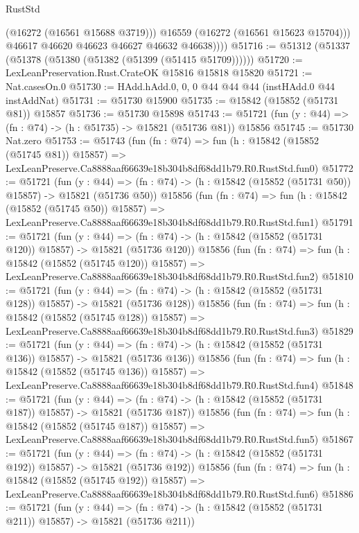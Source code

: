 \begin{lexlean}{RustStd}
\begin{coremodule}
                (@16272 (@16561 @15688 @3719)))
              @16559
              (@16272 (@16561 @15623 @15704)))
            @46617
            @46620
            @46623
            @46627
            @46632
            @46638))))
@51716 := @51312 (@51337 (@51378 (@51380 (@51382 (@51399 (@51415 @51709))))))
@51720 := LexLeanPreservation.Rust.CrateOK @15816 @15818 @15820
@51721 := Nat.casesOn.{0}
@51730 := HAdd.hAdd.{0, 0, 0} @44 @44 @44 (instHAdd.{0} @44 instAddNat)
@51731 := @51730 @15900
@51735 := @15842 (@15852 (@51731 @81)) @15857
@51736 := @51730 @15898
@51743 := @51721 (fun (y : @44) => (fn : @74) -> (h : @51735) -> @15821 (@51736 @81)) @15856
@51745 := @51730 Nat.zero
@51753 := @51743
    (fun (fn : @74) =>
    fun (h : @15842 (@15852 (@51745 @81)) @15857) =>
    LexLeanPreserve.Ca8888aaf66639e18b304b8df68dd1b79.R0.RustStd.fun0)
@51772 := @51721
    (fun (y : @44) =>
    (fn : @74) -> (h : @15842 (@15852 (@51731 @50)) @15857) -> @15821 (@51736 @50))
    @15856
    (fun (fn : @74) =>
    fun (h : @15842 (@15852 (@51745 @50)) @15857) =>
    LexLeanPreserve.Ca8888aaf66639e18b304b8df68dd1b79.R0.RustStd.fun1)
@51791 := @51721
    (fun (y : @44) =>
    (fn : @74) -> (h : @15842 (@15852 (@51731 @120)) @15857) -> @15821 (@51736 @120))
    @15856
    (fun (fn : @74) =>
    fun (h : @15842 (@15852 (@51745 @120)) @15857) =>
    LexLeanPreserve.Ca8888aaf66639e18b304b8df68dd1b79.R0.RustStd.fun2)
@51810 := @51721
    (fun (y : @44) =>
    (fn : @74) -> (h : @15842 (@15852 (@51731 @128)) @15857) -> @15821 (@51736 @128))
    @15856
    (fun (fn : @74) =>
    fun (h : @15842 (@15852 (@51745 @128)) @15857) =>
    LexLeanPreserve.Ca8888aaf66639e18b304b8df68dd1b79.R0.RustStd.fun3)
@51829 := @51721
    (fun (y : @44) =>
    (fn : @74) -> (h : @15842 (@15852 (@51731 @136)) @15857) -> @15821 (@51736 @136))
    @15856
    (fun (fn : @74) =>
    fun (h : @15842 (@15852 (@51745 @136)) @15857) =>
    LexLeanPreserve.Ca8888aaf66639e18b304b8df68dd1b79.R0.RustStd.fun4)
@51848 := @51721
    (fun (y : @44) =>
    (fn : @74) -> (h : @15842 (@15852 (@51731 @187)) @15857) -> @15821 (@51736 @187))
    @15856
    (fun (fn : @74) =>
    fun (h : @15842 (@15852 (@51745 @187)) @15857) =>
    LexLeanPreserve.Ca8888aaf66639e18b304b8df68dd1b79.R0.RustStd.fun5)
@51867 := @51721
    (fun (y : @44) =>
    (fn : @74) -> (h : @15842 (@15852 (@51731 @192)) @15857) -> @15821 (@51736 @192))
    @15856
    (fun (fn : @74) =>
    fun (h : @15842 (@15852 (@51745 @192)) @15857) =>
    LexLeanPreserve.Ca8888aaf66639e18b304b8df68dd1b79.R0.RustStd.fun6)
@51886 := @51721
    (fun (y : @44) =>
    (fn : @74) -> (h : @15842 (@15852 (@51731 @211)) @15857) -> @15821 (@51736 @211))

\end{coremodule}
\end{lexlean}
